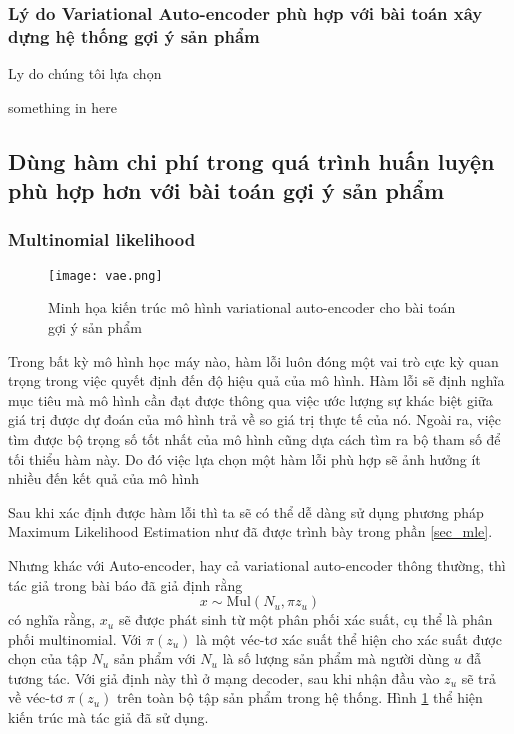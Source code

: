     \subsubsection{Lý do Variational Auto-encoder phù hợp với bài toán xây dựng hệ thống gợi ý sản phẩm}
    Ly do chúng tôi lựa chọn

    \label{why_vae}
    something in here
    \subsection{Dùng hàm chi phí trong quá trình huấn luyện phù hợp hơn với bài toán gợi ý sản phẩm}


    \subsubsection{Multinomial likelihood}
    \label{mulll}
    \begin{figure}
        \centering
        \texttt{[image: vae.png]}
        \caption{Minh họa kiến trúc mô hình variational auto-encoder cho bài toán gợi ý sản phẩm}
        \label{fig_mvae}
    \end{figure}
    Trong bất kỳ mô hình học máy nào, hàm lỗi luôn đóng một vai trò cực kỳ quan trọng trong việc quyết định đến độ hiệu quả của mô hình. 
    Hàm lỗi sẽ định nghĩa mục tiêu mà mô hình cần đạt được thông qua việc ước lượng sự khác biệt giữa giá trị được dự đoán của mô hình trả về so giá trị thực tế của nó.
    Ngoài ra, việc tìm được bộ trọng số tốt nhất của mô hình cũng dựa cách tìm ra bộ tham số để tối thiểu hàm này.
    Do đó việc lựa chọn một hàm lỗi phù hợp sẽ ảnh hưởng ít nhiều đến kết quả của mô hình 

    Sau khi xác định được hàm lỗi thì ta sẽ có thể dễ dàng sử dụng phương pháp Maximum Likelihood Estimation như đã được trình bày trong phần \ref{sec_mle}.

    Nhưng khác với Auto-encoder, hay cả variational auto-encoder thông thường, thì tác giả trong bài báo \cite{mvae} đã giả định rằng 
    \begin{equation}
        \label{asumpt_xu}
        x \sim \text{Mul}(N_u,\pi{z_u})
    \end{equation}
    có nghĩa rằng, $x_u$ sẽ được phát sinh từ một phân phối xác suất, cụ thể là phân phối multinomial.
    Với $\pi(z_u)$ là một véc-tơ xác suất thể hiện cho xác suất được chọn của tập $N_u$ sản phẩm  với $N_u$ là số lượng sản phẩm mà người dùng $u$ đẫ tương tác. 
    Với giả định này thì ở mạng decoder, sau khi nhận đầu vào $z_u$ sẽ trả về véc-tơ $\pi(z_u)$ trên toàn bộ tập sản phẩm trong hệ thống. 
    Hình \ref{fig_mvae} thể hiện kiến trúc mà tác giả đã sử dụng. 

